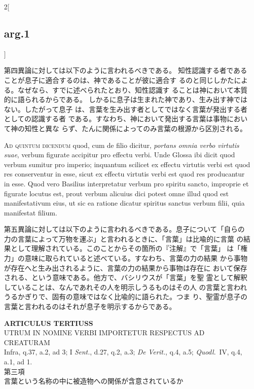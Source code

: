 \documentclass[paper=a4paper,fontsize=10pt,jafontsize=9pt,titlepage]{jlreq}
\begin{document}
\begin{paracol}{2}[\subsection{arg.1}]
\switchcolumn

第四異論に対しては以下のように言われるべきである。
知性認識する者であることが息子に適合するのは、神であることが彼に適合す
 るのと同じしかたによる。なぜなら、すでに述べられたとおり、知性認識す
 ることは神において本質的に語られるからである。
しかるに息子は生まれた神であり、生み出す神ではない。したがって息子
 は、言葉を生み出す者としてではなく言葉が発出する者としての認識する者
 である。すなわち、神において発出する言葉は事物において神の知性と異な
 らず、たんに関係によってのみ言葉の根源から区別される。

\switchcolumn*[\subsection{ad.5}]

{\scshape Ad quintum dicendum} quod, cum de filio dicitur, {\itshape portans omnia verbo
virtutis suae}, verbum figurate accipitur pro effectu verbi. Unde
Glossa ibi dicit quod verbum sumitur pro imperio; inquantum scilicet
ex effectu virtutis verbi est quod res conserventur in esse, sicut ex
effectu virtutis verbi est quod res producantur in esse. Quod vero
Basilius interpretatur verbum pro spiritu sancto, improprie et
figurate locutus est, prout verbum alicuius dici potest omne illud
quod est manifestativum eius, ut sic ea ratione dicatur spiritus
sanctus verbum filii, quia manifestat filium.

\switchcolumn

第五異論に対しては以下のように言われるべきである。息子について「自らの
 力の言葉によって万物を運ぶ」と言われるときに、「言葉」は比喩的に言葉
 の結果として理解されている。このことからその箇所の『注解』で「言葉」
 は「権力」の意味に取られていると述べている。すなわち、言葉の力の結果
 から事物が存在へと生み出されるように、言葉の力の結果から事物は存在に
 おいて保存される、という意味である。他方で、バシリウスが「言葉」を聖
 霊として解釈していることは、なんであれその人を明示しうるものはその人
 の言葉と言われうるかぎりで、固有の意味ではなく比喩的に語られた。つま
 り、聖霊が息子の言葉と言われるのはそれが息子を明示するからである。

\end{paracol}
\newpage





\begin{center}
{\Large {\bfseries ARTICULUS TERTIUSS}}\\
{\large UTRUM IN NOMINE VERBI IMPORTETUR RESPECTUS AD CREATURAM}\\
{\footnotesize Infra, q.37, a.2, ad 3; I {\itshape Sent.}, d.27, q.2,
 a.3; {\itshape De Verit.}, q.4, a.5; {\itshape Quodl.}~IV, q.4, a.1,
 ad 1.}\\
{\Large 第三項\\言葉という名称の中に被造物への関係が含意されているか}
\end{center}
\end{document}
